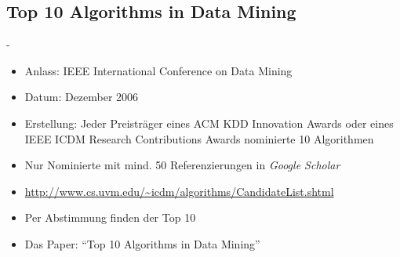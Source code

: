 \documentclass[fleqn,11pt,aspectratio=43]{beamer}
\begin{document}
\subsection{Top 10 Algorithms in Data Mining~}
\begin{frame}{\insertsectionhead - \insertsubsectionhead \cite{wu2008top}}
\begin{itemize}
\setlength{\itemsep}{10pt}
\item Anlass: IEEE International Conference on Data Mining
\item Datum: Dezember 2006
\item Erstellung: Jeder Preisträger eines ACM KDD Innovation Awards oder eines IEEE ICDM Research 
Contributions Awards nominierte 10 Algorithmen
\item Nur Nominierte mit mind. 50 Referenzierungen in \emph{Google Scholar}
\item 
{\small\url{http://www.cs.uvm.edu/~icdm/algorithms/CandidateList.shtml}}
\item Per Abstimmung finden der Top 10
\item Das Paper: \enquote{Top 10 Algorithms in Data Mining} \cite{wu2008top}
\end{itemize}
\end{frame}
\end{document}
